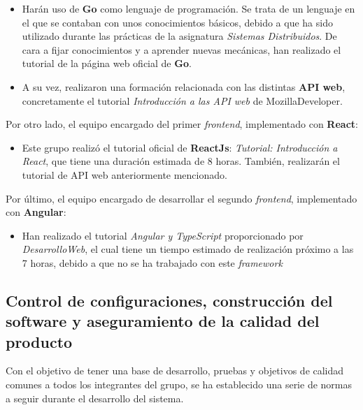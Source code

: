 \documentclass[11pt, a4paper, titlepage]{article}
\begin{document}
\begin{itemize}

\item Harán uso de \textbf{Go} como lenguaje de programación. Se trata de un lenguaje en el que se contaban con unos conocimientos básicos, debido a que ha sido utilizado durante las prácticas de la asignatura \textit{Sistemas Distribuidos}. De cara a fijar conocimientos y a aprender nuevas mecánicas, han realizado el tutorial de la página web oficial de \textbf{Go}. 

\item A su vez, realizaron una formación relacionada con las distintas \textbf{API web}, concretamente el tutorial \textit{Introducción a las API web} de MozillaDeveloper\cite{apisweb}.

\end{itemize}

Por otro lado, el equipo encargado del primer \textit{frontend}, implementado con \textbf{React}: 

\begin{itemize}

\item  Este grupo realizó el tutorial oficial de \textbf{ReactJs}: \textit{Tutorial: Introducción a React}\cite{reactjs}, que tiene una duración estimada de 8 horas. También, realizarán el tutorial de API web anteriormente mencionado\cite{apisweb}.

\end{itemize}

Por último, el equipo encargado de desarrollar el segundo \textit{frontend}, implementado con \textbf{Angular}: 

\begin{itemize}

\item Han realizado el tutorial \textit{Angular y TypeScript}\cite{angular} proporcionado por \textit{DesarrolloWeb}, el cual tiene un tiempo estimado de realización próximo a las 7 horas, debido a que no se ha trabajado con este \textit{framework}

\end{itemize}


\subsection{Control de configuraciones, construcción del software y aseguramiento de la calidad del producto}

Con el objetivo de tener una base de desarrollo, pruebas y objetivos de calidad comunes a todos los integrantes del grupo, se ha establecido una serie de normas a seguir durante el desarrollo del sistema. 
\end{document}
